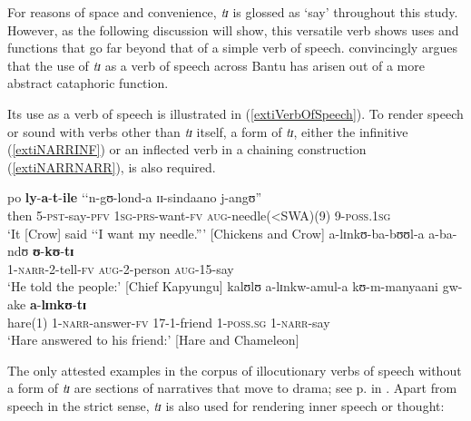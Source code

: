 For reasons of space and convenience, \textit{tɪ} is glossed as `say' throughout this study. However, as the following discussion will show, this versatile verb shows uses and functions that go far beyond that of a simple verb of speech. \citet{GueldemannT2000} convincingly argues that the use of \textit{tɪ} as a verb of speech across Bantu has arisen out of a more abstract cataphoric function.

Its use as a verb of speech is illustrated in (\ref{extiVerbOfSpeech}). To render speech or sound with verbs other than \textit{tɪ} itself, a form of \textit{tɪ}, either the infinitive (\ref{extiNARRINF}) or an inflected verb in a chaining construction (\ref{extiNARRNARR}), is also required.
 
\begin{exe}
\ex \label{extiVerbOfSpeech}
\gll po \textbf{ly}-\textbf{a}-\textbf{t}-\textbf{ile} \textup{\lq\lq}n-gʊ-lond-a ɪɪ-sindaano j-angʊ\textup{''}\\
then 5-\textsc{pst}-say-\textsc{pfv} \phantom{\lq\lq}\textsc{1sg}-\textsc{prs}-want-\textsc{fv} \textsc{aug}-needle(<SWA)(9) 9-\textsc{poss.1sg}\\
\glt \lq It [Crow] said \lq\lq I want my needle.''{}' [Chickens and Crow]
\ex \label{extiNARRINF} \gll a-lɪnkʊ-ba-bʊʊl-a a-ba-ndʊ \textbf{ʊ}-\textbf{kʊ}-\textbf{tɪ}\\
1-\textsc{narr}-2-tell-\textsc{fv} \textsc{aug}-2-person \textsc{aug}-15-say\\
\glt `He told the people:' [Chief Kapyungu]
\ex\label{extiNARRNARR} \gll kalʊlʊ a-lɪnkw-amul-a kʊ-m-manyaani gw-ake \textbf{a}-\textbf{lɪnkʊ}-\textbf{tɪ}\\
hare(1) 1-\textsc{narr}-answer-\textsc{fv} 17-1-friend 1-\textsc{poss.sg} 1-\textsc{narr}-say\\
\glt `Hare answered to his friend:' [Hare and Chameleon]
\end{exe}

The only attested examples in the corpus of illocutionary verbs of speech without a form of \textit{tɪ} are sections of narratives that move to drama; see p.\nobreakspace\pageref{Drama} in . Apart from speech in the strict sense, \textit{tɪ} is also used for rendering inner speech or thought:

